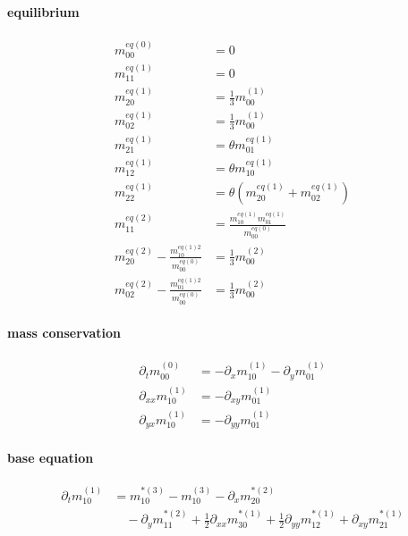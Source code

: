 \documentclass{article}
\begin{document}
  \paragraph{equilibrium}
  \begin{align}
    m_{00}^{eq(0)} & = 0 \tag{Q1} \\
    m_{11}^{eq(1)} & = 0 \tag{Q2} \\
    m_{20}^{eq(1)} & = \frac{1}{3} m_{00}^{(1)} \tag{Q3} \\
    m_{02}^{eq(1)} & = \frac{1}{3} m_{00}^{(1)}  \tag{Q4} \\
    m_{21}^{eq(1)} & = \theta m_{01}^{eq(1)} \tag{Q5} \\
    m_{12}^{eq(1)} & = \theta m_{10}^{eq(1)} \tag{Q6} \\
    m_{22}^{eq(1)} & = \theta (m_{20}^{eq(1)} + m_{02}^{eq(1)}) \tag{Q7} \\
    m_{11}^{eq(2)} & = \frac{ m_{10}^{eq(1)}m_{01}^{eq(1)}}{m_{00}^{eq(0)}} \tag{Q8} \\
    m_{20}^{eq(2)} - \frac{ m_{10}^{eq(1)2}}{m_{00}^{eq(0)}} & = \frac{1}{3} m_{00}^{(2)} \tag{Q9} \\
    m_{02}^{eq(2)} - \frac{ m_{01}^{eq(1)2}}{m_{00}^{eq(0)}} & = \frac{1}{3} m_{00}^{(2)} \tag{Q10}
  \end{align}

  \paragraph{mass conservation}
  \begin{align}
    \partial_t m_{00}^{(0)}  & =  - \partial_x m_{10}^{(1)} - \partial_y m_{01}^{(1)}\tag{M1} \\
    \partial_{xx} m_{10}^{(1)}  & = - \partial_{xy} m_{01}^{(1)} \tag{M2}\\
    \partial_{yx} m_{10}^{(1)}  & = - \partial_{yy} m_{01}^{(1)} \tag{M3}
  \end{align}

  \paragraph{base equation}
  \begin{equation}
    \tag{B1}
    \begin{aligned}
       \partial_t m_{10}^{(1)} & =
      m_{10}^{*(3)} - m_{10}^{(3)} - \partial_x m_{20}^{*(2)} \\
      &\quad - \partial_y m_{11}^{*(2)} + \frac{1}{2}\partial_{xx} m_{30}^{*(1)} + \frac{1}{2} \partial_{yy} m_{12}^{*(1)} + \partial_{xy} m_{21}^{*(1)}
    \end{aligned}
  \end{equation}
\end{document}

